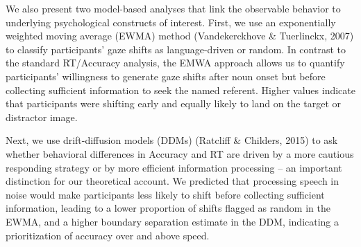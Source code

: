 \documentclass[10pt, letterpaper]{article}
\begin{document}
We also present two model-based analyses that link the observable
behavior to underlying psychological constructs of interest. First, we
use an exponentially weighted moving average (EWMA) method
(Vandekerckhove \& Tuerlinckx, 2007) to classify participants' gaze
shifts as language-driven or random. In contrast to the standard
RT/Accuracy analysis, the EMWA approach allows us to quantify
participants' willingness to generate gaze shifts after noun onset but
before collecting sufficient information to seek the named referent.
Higher values indicate that participants were shifting early and equally
likely to land on the target or distractor image.

Next, we use drift-diffusion models (DDMs) (Ratcliff \& Childers, 2015)
to ask whether behavioral differences in Accuracy and RT are driven by a
more cautious responding strategy or by more efficient information
processing -- an important distinction for our theoretical account. We
predicted that processing speech in noise would make participants less
likely to shift before collecting sufficient information, leading to a
lower proportion of shifts flagged as random in the EWMA, and a higher
boundary separation estimate in the DDM, indicating a prioritization of
accuracy over and above speed.
\end{document}
